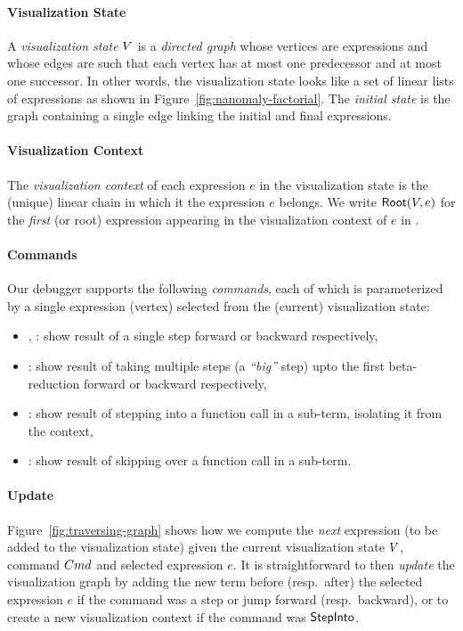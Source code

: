 \paragraph{Visualization State}
%
A \emph{visualization state} $V$ is a \emph{directed graph}
whose vertices are expressions and whose edges are such
that each vertex has at most one predecessor and at most one
successor. In other words, the visualization state looks
like a set of linear lists of expressions as shown in
Figure~\ref{fig:nanomaly-factorial}.
%
The \emph{initial state} is the graph containing a single
edge linking the initial and final expressions.

\paragraph{Visualization Context}
%
The \emph{visualization context} of each expression $e$
in the visualization state \vstate is the (unique) linear chain
in which it the expression $e$ belongs.
%
We write $\mathsf{Root}(V, e)$ for the \emph{first} (or root)
expression appearing in the visualization context of $e$ in
\vstate.

\paragraph{Commands}
Our debugger supports the following \emph{commands}, each of which
is parameterized by a single expression (vertex) selected from the
(current) visualization state:
%
\begin{itemize}
%
\item \stepforwardsym, \stepbackwardsym:
      show result of a single step forward or backward respectively,
%
\item \jumpforwardsym:
      show result of taking multiple steps (a \emph{``big''} step)
      upto the first beta-reduction forward or backward respectively,
%
\item \stepintosym:
      show result of stepping into a function call in a sub-term,
      isolating it from the context,

\item \stepoversym:
      show result of skipping over a function call in a sub-term.
\end{itemize}



\paragraph{Update}
%
Figure~\ref{fig:traversing-graph} shows
how we compute the \emph{next} expression
(to be added to the visualization state)
given the current visualization state
$V$, command $Cmd$ and selected
expression $e$.
%
It is straightforward to then \emph{update}
the visualization graph by adding the new
term before (resp.\ after) the selected
expression $e$ if the command was a step
or jump forward (resp.\ backward), or
to create a new visualization context
if the command was $\mathsf{StepInto}$.


